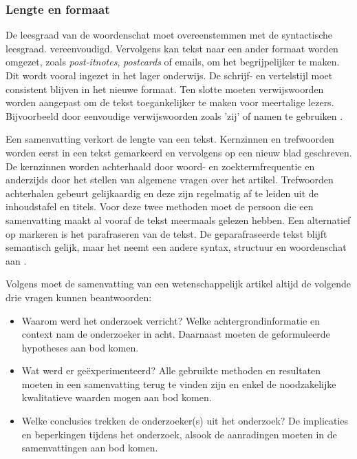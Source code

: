 
\subsubsection{Lengte en formaat}

De leesgraad van de woordenschat moet overeenstemmen met de syntactische leesgraad. vereenvoudigd. Vervolgens kan tekst naar een ander formaat worden omgezet, zoals \textit{post-itnotes}, \textit{postcards} of emails, om het begrijpelijker te maken. Dit wordt vooral ingezet in het lager onderwijs. De schrijf- en vertelstijl moet consistent blijven in het nieuwe formaat. Ten slotte moeten verwijswoorden worden aangepast om de tekst toegankelijker te maken voor meertalige lezers. Bijvoorbeeld door eenvoudige verwijswoorden zoals 'zij' of namen te gebruiken \autocite{Rijkhoff2022}. 

Een samenvatting verkort de lengte van een tekst. Kernzinnen en trefwoorden worden eerst in een tekst gemarkeerd en vervolgens op een nieuw blad geschreven. De kernzinnen worden achterhaald door woord- en zoektermfrequentie en anderzijds door het stellen van algemene vragen over het artikel. Trefwoorden achterhalen gebeurt gelijkaardig en deze zijn regelmatig af te leiden uit de inhoudstafel en titels. Voor deze twee methoden moet de persoon die een samenvatting maakt al vooraf de tekst meermaals gelezen hebben. Een alternatief op markeren is het parafraseren van de tekst. De geparafraseerde tekst blijft semantisch gelijk, maar het neemt een andere syntax, structuur en woordenschat aan \autocite{Rijkhoff2022}.

Volgens \textcite{Hollenkamp2020, McCombes2022} moet de samenvatting van een wetenschappelijk artikel altijd de volgende drie vragen kunnen beantwoorden: 

\begin{itemize}
	\item Waarom werd het onderzoek verricht? Welke achtergrondinformatie en context nam de onderzoeker in acht. Daarnaast moeten de geformuleerde hypotheses aan bod komen.
	\item Wat werd er geëxperimenteerd? Alle gebruikte methoden en resultaten moeten in een samenvatting terug te vinden zijn en enkel de noodzakelijke kwalitatieve waarden mogen aan bod komen.
	\item Welke conclusies trekken de onderzoeker(s) uit het onderzoek? De implicaties en beperkingen tijdens het onderzoek, alsook de aanradingen moeten in de samenvattingen aan bod komen.
\end{itemize}

